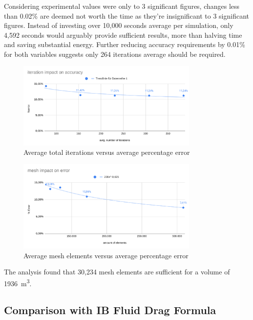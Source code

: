 \documentclass[12pt,a4paper]{article}
\begin{document}
Considering experimental values were only to 3 significant figures, changes less than 0.02\% are deemed not worth the time as they're insignificant to 3 significant figures. Instead of investing over 10,000 seconds average per simulation, only 4,592 seconds would arguably provide sufficient results, more than halving time and saving substantial energy. Further reducing accuracy requirements by 0.01\% for both variables suggests only 264 iterations average should be required.

\begin{figure}[H]
    \centering
    \includegraphics[width=0.8\textwidth]{image11.png}
    \caption{Average total iterations versus average percentage error}
    \label{fig:iterations_vs_error}
\end{figure}

\begin{figure}[H]
    \centering
    \includegraphics[width=0.8\textwidth]{image2.png}
    \caption{Average mesh elements versus average percentage error}
    \label{fig:mesh_vs_error}
\end{figure}

The analysis found that 30,234 mesh elements are sufficient for a volume of \SI{1936}{\meter\cubed}.

\subsection{Comparison with IB Fluid Drag Formula}
\end{document}
